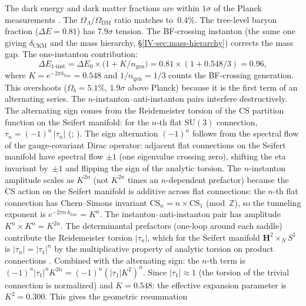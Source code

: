 \begin{proposition}[Cosmological energy budget at $N = 11$]
The dark energy and dark matter fractions are within $1\sigma$ of the
Planck measurements \citep{Planck2018}.
The $\Omega_\Lambda/\Omega_{\mathrm{DM}}$ ratio matches to~$0.4\%$.
The tree-level baryon fraction ($\Delta E = 0.81$) has $7.9\sigma$ tension.
The BF-crossing instanton (the same one giving
$\delta_{\mathrm{CKM}}$ and the mass hierarchy,
\S\ref*{IV-sec:mass-hierarchy}) corrects the mass gap.
The one-instanton contribution:
\begin{equation}\label{eq:mass-gap-inst}
  \Delta E_{\mathrm{1\text{-}inst}}
  = \Delta E_0 \times \bigl(1 + K / n_{\mathrm{gen}}\bigr)
  = 0.81 \times (1 + 0.548/3) = 0.96,
\end{equation}
where $K = e^{-2\pi k_{\mathrm{frac}}} = 0.548$ and
$1/n_{\mathrm{gen}} = 1/3$ counts the BF-crossing generation.
This overshoots ($\Omega_b = 5.1\%$, $1.9\sigma$ above Planck)
because it is the first term of an alternating series.
The $n$-instanton--anti-instanton pairs interfere destructively.
The alternating sign comes from the Reidemeister torsion
of the CS partition function on the Seifert manifold:
for the $n$-th flat $\mathrm{SU}(3)$ connection,
$\tau_n = (-1)^n\,|\tau_n|$
(\citealt{Jeffrey1992};
\citealt{Rozansky1995}).
The sign alternation $(-1)^n$ follows from the
spectral flow of the gauge-covariant Dirac operator:
adjacent flat connections on the Seifert manifold
have spectral flow $\pm 1$
(one eigenvalue crossing zero),
shifting the eta invariant by~$\pm 1$
and flipping the sign of the analytic torsion.
The $n$-instanton amplitude scales as $K^{2n}$ (not
$K^{2n}$ times an $n$-dependent prefactor) because
the CS action on the Seifert manifold is additive
across flat connections: the $n$-th flat connection
has Chern--Simons invariant $\mathrm{CS}_n = n \times
\mathrm{CS}_1$ (mod~$\mathbb{Z}$), so the tunneling
exponent is $e^{-2\pi n \,k_{\mathrm{frac}}} = K^n$.
The instanton--anti-instanton pair has amplitude $K^n
\times K^n = K^{2n}$.
The determinantal prefactors (one-loop around each
saddle) contribute the Reidemeister torsion $|\tau_n|$,
which for the Seifert manifold $\mathbf{H}^2 \times_N
S^1$ is $|\tau_n| = |\tau_1|^n$ by the multiplicative
property of analytic torsion on product connections
\citep{Rozansky1995}.
Combined with the alternating sign: the $n$-th term
is $(-1)^n |\tau_1|^n K^{2n} = (-1)^n (|\tau_1| K^2)^n$.
Since $|\tau_1| \approx 1$ (the torsion of the trivial
connection is normalized) and $K = 0.548$:
the effective expansion parameter is $K^2 = 0.300$.
This gives the geometric resummation
\begin{equation}\label{eq:mass-gap-resum}

\end{equation}
\end{proposition}
